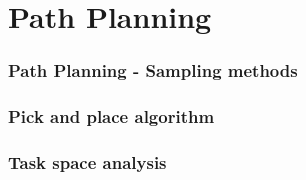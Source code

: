 \section{Path Planning}

\begin{frame}
\frametitle{Path Planning - Sampling methods}
\end{frame}

\begin{frame}
\frametitle{Pick and place algorithm}
\end{frame}

\begin{frame}
\frametitle{Task space analysis}
\end{frame}
